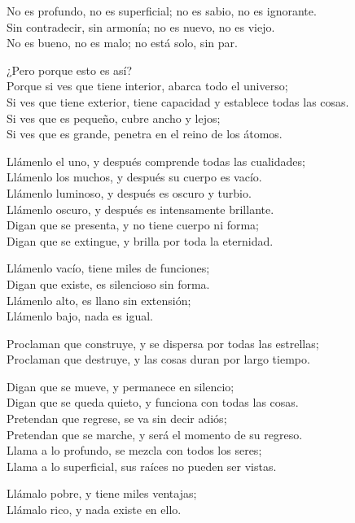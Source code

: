 \documentclass[book,b5paper,hidelinks,final]{memoir}
\begin{document}
	No es profundo, no es superficial; no es sabio, no es ignorante.\\
	Sin contradecir, sin armonía; no es nuevo, no es viejo.\\
	No es bueno, no es malo; no está solo, sin par.
	
	¿Pero porque esto es así?\\
	Porque si ves que tiene interior, abarca todo el universo;\\
	Si ves que tiene exterior, tiene capacidad y establece todas las
	cosas.\\
	Si ves que es pequeño, cubre ancho y lejos;\\
	Si ves que es grande, penetra en el reino de los átomos.
	
	Llámenlo el uno, y después comprende todas las cualidades;\\
	Llámenlo los muchos, y después su cuerpo es vacío.\\
	Llámenlo luminoso, y después es oscuro y turbio.\\
	Llámenlo oscuro, y después es intensamente brillante.\\
	Digan que se presenta, y no tiene cuerpo ni forma;\\
	Digan que se extingue, y brilla por toda la eternidad.
	
	Llámenlo vacío, tiene miles de funciones;\\
	Digan que existe, es silencioso sin forma.\\
	Llámenlo alto, es llano sin extensión;\\
	Llámenlo bajo, nada es igual.
	
	Proclaman que construye, y se dispersa por todas las estrellas;\\
	Proclaman que destruye, y las cosas duran por largo tiempo.
	
	Digan que se mueve, y permanece en silencio;\\
	Digan que se queda quieto, y funciona con todas las cosas.\\
	Pretendan que regrese, se va sin decir adiós;\\
	Pretendan que se marche, y será el momento de su regreso.\\
	Llama a lo profundo, se mezcla con todos los seres;\\
	Llama a lo superficial, sus raíces no pueden ser vistas.
	
	Llámalo pobre, y tiene miles ventajas;\\
	Llámalo rico, y nada existe en ello.
	
\end{document}
